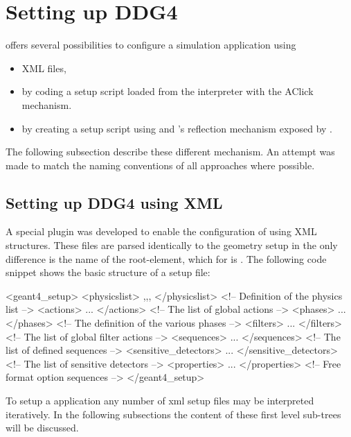 \documentclass[10pt,a4paper]{article}
\begin{document}
\newpage
\section{Setting up DDG4}
\label{sec:ddg4-implementation-setup}

\noindent
\DDG offers several possibilities to configure a simulation application
using
\begin{itemize}\itemcompact
\item XML files,
\item by coding a setup script loaded from the  interpreter 
	with the AClick	mechanism.
\item by creating a setup script using  and 
	's reflection mechanism exposed by .
\end{itemize}
The following subsection describe these different mechanism. An attempt was made
to match the naming conventions of all approaches where possible.

\subsection{Setting up DDG4 using XML}
\label{sec:ddg4-implementation-setup-xml}

\noindent
A special plugin was developed to enable the configuration of \DDG using
XML structures. These files are parsed identically to the geometry setup
in \DDhep the only difference is the name of the root-element, which for 
\DDG is . 
The following code snippet shows the basic structure of a \DDG setup file:
\begin{unnumberedcode}
<geant4_setup>
  <physicslist>          ,,,  </physicslist>  <!-- Definition of the physics list          -->
  <actions>              ...  </actions>      <!-- The list of global actions              -->
  <phases>               ...  </phases>       <!-- The definition of the various phases    -->
  <filters>              ...  </filters>      <!-- The list of global filter actions       -->
  <sequences>            ...  </sequences>    <!-- The list of defined sequences           -->
  <sensitive_detectors>  ...  </sensitive_detectors>  <!-- The list of sensitive detectors -->
  <properties>           ...  </properties>   <!-- Free format option sequences            -->
</geant4_setup>
\end{unnumberedcode}
To setup a  application any number of xml setup files may be interpreted 
iteratively. In the following subsections the content of these first level sub-trees will
be discussed.
\end{document}
